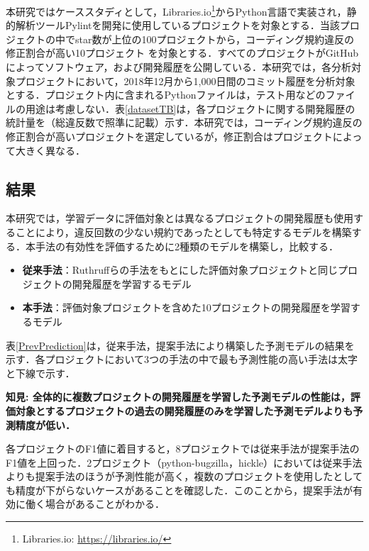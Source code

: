 \documentclass[T,J]{fose} %
\begin{document}
本研究ではケーススタディとして，Libraries.io\footnote{Libraries.io: \url{https://libraries.io/}}からPython言語で実装され，静的解析ツールPylintを開発に使用しているプロジェクトを対象とする．当該プロジェクトの中でstar数が上位の100プロジェクトから，コーディング規約違反の修正割合が高い10プロジェクト
を対象とする．すべてのプロジェクトがGitHubによってソフトウェア，および開発履歴を公開している．本研究では，各分析対象プロジェクトにおいて，2018年12月から1,000日間のコミット履歴を分析対象とする．プロジェクト内に含まれるPythonファイルは，テスト用などのファイルの用途は考慮しない．表\ref{datasetTB}は，各プロジェクトに関する開発履歴の統計量を（総違反数で照準に記載）示す．本研究では，コーディング規約違反の修正割合が高いプロジェクトを選定しているが，修正割合はプロジェクトによって大きく異なる．

\subsection{結果}

本研究では，学習データに評価対象とは異なるプロジェクトの開発履歴も使用することにより，違反回数の少ない規約であったとしても特定するモデルを構築する．本手法の有効性を評価するために2種類のモデルを構築し，比較する．
\begin{itemize}
\item \textbf{従来手法}：Ruthruffらの手法\cite{JyuraiPre}をもとにした評価対象プロジェクトと同じプロジェクトの開発履歴を学習するモデル
\item \textbf{本手法}：評価対象プロジェクトを含めた10プロジェクトの開発履歴を学習するモデル
\end{itemize}

表\ref{PrevPrediction}は，従来手法，提案手法により構築した予測モデルの結果を示す．各プロジェクトにおいて3つの手法の中で最も予測性能の高い手法は太字と下線で示す．

\noindent\textbf{知見: 全体的に複数プロジェクトの開発履歴を学習した予測モデルの性能は，評価対象とするプロジェクトの過去の開発履歴のみを学習した予測モデルよりも予測精度が低い．}

各プロジェクトのF1値に着目すると，8プロジェクトでは従来手法が提案手法のF1値を上回った．2プロジェクト（python-bugzilla，hickle）においては従来手法よりも提案手法のほうが予測性能が高く，複数のプロジェクトを使用したとしても精度が下がらないケースがあることを確認した．このことから，提案手法が有効に働く場合があることがわかる．
\end{document}
